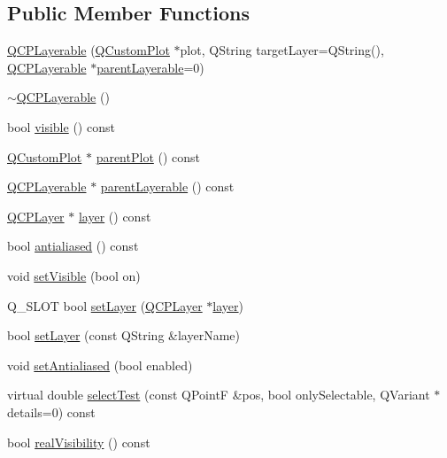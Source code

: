 \subsection*{Public Member Functions}
\begin{DoxyCompactItemize}
\item 
\hyperlink{class_q_c_p_layerable_a74c0fa237f29bf0e49565013fc5d1ec0}{Q\+C\+P\+Layerable} (\hyperlink{class_q_custom_plot}{Q\+Custom\+Plot} $\ast$plot, Q\+String target\+Layer=Q\+String(), \hyperlink{class_q_c_p_layerable}{Q\+C\+P\+Layerable} $\ast$\hyperlink{class_q_c_p_layerable_a98d79f5b716d45eac4347befe546d0ec}{parent\+Layerable}=0)
\item 
\hyperlink{class_q_c_p_layerable_a4231cf5b3601d6d3a5781283e7a9735b}{$\sim$\+Q\+C\+P\+Layerable} ()
\item 
bool \hyperlink{class_q_c_p_layerable_a10a3cc92e0fa63e4a929e61d34e275a7}{visible} () const 
\item 
\hyperlink{class_q_custom_plot}{Q\+Custom\+Plot} $\ast$ \hyperlink{class_q_c_p_layerable_ab7e0e94461566093d36ffc0f5312b109}{parent\+Plot} () const 
\item 
\hyperlink{class_q_c_p_layerable}{Q\+C\+P\+Layerable} $\ast$ \hyperlink{class_q_c_p_layerable_a98d79f5b716d45eac4347befe546d0ec}{parent\+Layerable} () const 
\item 
\hyperlink{class_q_c_p_layer}{Q\+C\+P\+Layer} $\ast$ \hyperlink{class_q_c_p_layerable_aea67e8c19145e70d68c286a36f6b8300}{layer} () const 
\item 
bool \hyperlink{class_q_c_p_layerable_aef5cb4aa899ed9dc9384fd614560291e}{antialiased} () const 
\item 
void \hyperlink{class_q_c_p_layerable_a3bed99ddc396b48ce3ebfdc0418744f8}{set\+Visible} (bool on)
\item 
Q\+\_\+\+S\+L\+O\+T bool \hyperlink{class_q_c_p_layerable_ab0d0da6d2de45a118886d2c8e16d5a54}{set\+Layer} (\hyperlink{class_q_c_p_layer}{Q\+C\+P\+Layer} $\ast$\hyperlink{class_q_c_p_layerable_aea67e8c19145e70d68c286a36f6b8300}{layer})
\item 
bool \hyperlink{class_q_c_p_layerable_ab25a0e7b897993b44447caee0f142083}{set\+Layer} (const Q\+String \&layer\+Name)
\item 
void \hyperlink{class_q_c_p_layerable_a4fd43e89be4a553ead41652565ff0581}{set\+Antialiased} (bool enabled)
\item 
virtual double \hyperlink{class_q_c_p_layerable_a4001c4d0dfec55598efa4d531f2179a9}{select\+Test} (const Q\+Point\+F \&pos, bool only\+Selectable, Q\+Variant $\ast$details=0) const 
\item 
bool \hyperlink{class_q_c_p_layerable_a30809f7455e9794bca7b6c737622fa63}{real\+Visibility} () const 
\end{DoxyCompactItemize}
